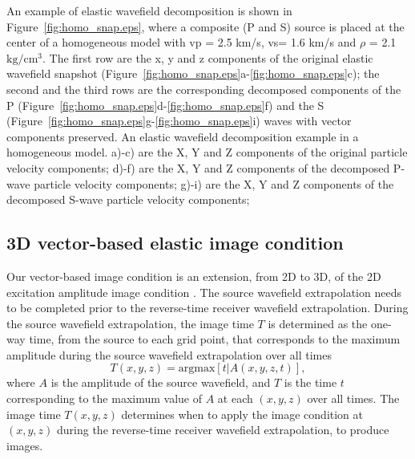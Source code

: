 \documentclass[manuscript,ulem,graphix,revised]{geophysics}
\begin{document}
An example of elastic wavefield decomposition is shown in Figure~\ref{fig:homo_snap.eps}, where a composite (P and S) source is placed at the center of a homogeneous model with vp = 2.5 km/s, vs= 1.6 km/s and $\rho$ = 2.1 $\mathrm{kg/cm^3}$. The first row are the x, y and z components of the original elastic wavefield snapshot (Figure~\ref{fig:homo_snap.eps}a-\ref{fig:homo_snap.eps}c); the second and the third rows are the corresponding decomposed components of the P (Figure~\ref{fig:homo_snap.eps}d-\ref{fig:homo_snap.eps}f) and the S (Figure~\ref{fig:homo_snap.eps}g-\ref{fig:homo_snap.eps}i) waves with vector components preserved. 
{
An elastic wavefield decomposition example in a homogeneous model.
a)-c) are the X, Y and Z components of the original particle velocity components;
d)-f) are the X, Y and Z components of the decomposed P-wave particle velocity components;
g)-i) are the X, Y and Z components of the decomposed S-wave particle velocity components;
}


\subsection{3D vector-based elastic image condition}

Our vector-based image condition is an extension, from 2D to 3D, of the 2D excitation amplitude image condition \citep{nguyen13}. The source wavefield extrapolation needs to be completed prior to the reverse-time receiver wavefield extrapolation. During the source wavefield extrapolation, the image time $T$ is determined as the one-way time, from the source to each grid point, that corresponds to the maximum amplitude during the source wavefield extrapolation over all times
\begin{equation}
T(x,y,z)=\mathrm{argmax}[t|A(x,y,z,t)],
\label{eqn:tmap}
\end{equation}
where $A$ is the amplitude of the source wavefield, and $T$ is the time $t$ corresponding to the maximum value of $A$ at each $(x,y,z)$ over all times. The image time $T(x,y,z)$ determines when to apply the image condition at $(x,y,z)$ during the reverse-time receiver wavefield extrapolation, to produce images.
\end{document}
